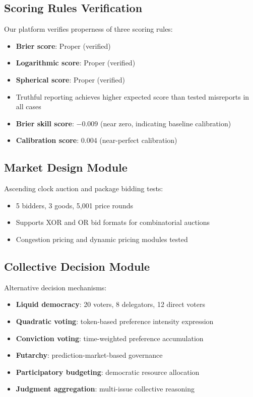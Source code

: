 \documentclass[10pt]{article}
\begin{document}
\subsection{Scoring Rules Verification}

Our platform verifies properness of three scoring rules:
\begin{itemize}[leftmargin=*,itemsep=1pt]
  \item \textbf{Brier score}: Proper (verified)
  \item \textbf{Logarithmic score}: Proper (verified)
  \item \textbf{Spherical score}: Proper (verified)
  \item Truthful reporting achieves higher expected score than tested misreports in all cases
  \item \textbf{Brier skill score}: $-0.009$ (near zero, indicating baseline calibration)
  \item \textbf{Calibration score}: 0.004 (near-perfect calibration)
\end{itemize}

\subsection{Market Design Module}

Ascending clock auction and package bidding tests:
\begin{itemize}[leftmargin=*,itemsep=1pt]
  \item 5 bidders, 3 goods, 5{,}001 price rounds
  \item Supports XOR and OR bid formats for combinatorial auctions
  \item Congestion pricing and dynamic pricing modules tested
\end{itemize}

\subsection{Collective Decision Module}

Alternative decision mechanisms:
\begin{itemize}[leftmargin=*,itemsep=1pt]
  \item \textbf{Liquid democracy}: 20 voters, 8 delegators, 12 direct voters
  \item \textbf{Quadratic voting}: token-based preference intensity expression
  \item \textbf{Conviction voting}: time-weighted preference accumulation
  \item \textbf{Futarchy}: prediction-market-based governance
  \item \textbf{Participatory budgeting}: democratic resource allocation
  \item \textbf{Judgment aggregation}: multi-issue collective reasoning
\end{itemize}
\end{document}
